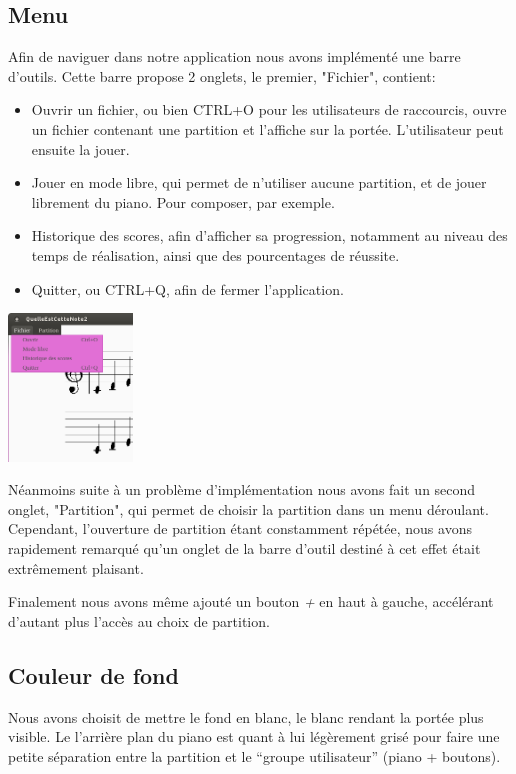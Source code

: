 \documentclass{article}
\begin{document}
\subsection{Menu}
Afin de naviguer dans notre application nous avons implémenté une barre d'outils. Cette barre propose 2 onglets, le premier, "Fichier", contient:

\begin{itemize}
\item Ouvrir un fichier, ou bien CTRL+O pour les utilisateurs de raccourcis, ouvre un fichier contenant une partition et l'affiche sur la portée. L'utilisateur peut ensuite la jouer.
\item Jouer en mode libre, qui permet de n'utiliser aucune partition, et de jouer librement du piano. Pour composer, par exemple.
\item Historique des scores, afin d'afficher sa progression, notamment au niveau des temps de réalisation, ainsi que des pourcentages de réussite.
\item Quitter, ou CTRL+Q, afin de fermer l'application. 
\end{itemize}
\begin{center}
\includegraphics[width = 125px]{./images/toolBar.png}
\end{center}
Néanmoins suite à un problème d'implémentation nous avons fait un second onglet, "Partition", qui permet de choisir la partition dans un menu déroulant. Cependant, l'ouverture de partition étant constamment répétée, nous avons rapidement remarqué qu'un onglet de la barre d'outil destiné à cet effet était extrêmement plaisant. 

Finalement nous avons même ajouté un bouton \emph{+} en haut à gauche, accélérant d'autant plus l'accès au choix de partition. 

\subsection{Couleur de fond}
Nous avons choisit de mettre le fond en blanc, le blanc rendant la portée plus visible.
Le l'arrière plan du piano est quant à lui légèrement grisé pour faire une petite séparation entre la partition et le 
``groupe utilisateur'' (piano + boutons).
\end{document}
